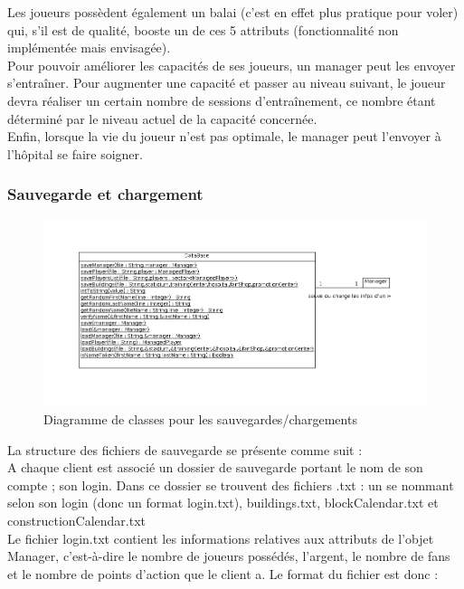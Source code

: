 \documentclass[a4paper,titlepage]{scrreprt}
\begin{document}
        Les joueurs possèdent également un balai (c'est en effet plus pratique pour voler) qui, s'il est de qualité, booste un de ces 5 attributs (fonctionnalité non implémentée mais envisagée).\\

        Pour pouvoir améliorer les capacités de ses joueurs, un manager peut les envoyer s'entraîner. Pour augmenter une capacité et passer au niveau suivant, le joueur devra réaliser un certain nombre de sessions d'entraînement, ce nombre étant déterminé par le niveau actuel de la capacité concernée.\\

        Enfin, lorsque la vie du joueur n'est pas optimale, le manager peut l'envoyer à l'hôpital se faire soigner.


      \subsubsection{Sauvegarde et chargement}
          \begin{figure}[H]
          \center
          \includegraphics[scale=0.4]{uml/class/DataBase.png}
         \caption{Diagramme de classes pour les sauvegardes/chargements}
         \end{figure}

        La structure des fichiers de sauvegarde se présente comme suit : \\

        A chaque client est associé un dossier de sauvegarde portant le nom de son compte ; son login.
        Dans ce dossier se trouvent des fichiers .txt : un se nommant selon son login (donc un format login.txt), buildings.txt, blockCalendar.txt et constructionCalendar.txt\\

        Le fichier login.txt contient les informations relatives aux attributs de l’objet Manager, c’est-à-dire le nombre de joueurs possédés, l’argent, le nombre de fans et le nombre de points d’action que le client a. Le format du fichier est donc :\\
       
\end{document}
